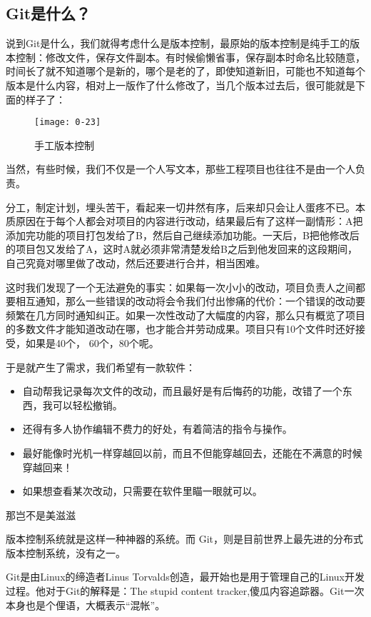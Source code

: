\subsection{Git是什么？}
说到Git是什么，我们就得考虑什么是版本控制，最原始的版本控制是纯手工的版本控制：修改文件，保存文件副本。有时候偷懒省事，保存副本时命名比较随意，时间长了就不知道哪个是新的，哪个是老的了，即使知道新旧，可能也不知道每个版本是什么内容，相对上一版作了什么修改了，当几个版本过去后，很可能就是下面的样子了：
\begin{figure}[htbp]
  \centering
  \texttt{[image: 0-23]}
  \caption{手工版本控制}\label{fig:0-23}
\end{figure}

当然，有些时候，我们不仅是一个人写文本，那些工程项目也往往不是由一个人负责。

分工，制定计划，埋头苦干，看起来一切井然有序，后来却只会让人蛋疼不已。本质原因在于每个人都会对项目的内容进行改动，结果最后有了这样一副情形：A把添加完功能的项目打包发给了B，然后自己继续添加功能。一天后，B把他修改后的项目包又发给了A，这时A就必须非常清楚发给B之后到他发回来的这段期间，自己究竟对哪里做了改动，然后还要进行合并，相当困难。

这时我们发现了一个无法避免的事实：如果每一次小小的改动，项目负责人之间都要相互通知，那么一些错误的改动将会令我们付出惨痛的代价：一个错误的改动要频繁在几方同时通知纠正。如果一次性改动了大幅度的内容，那么只有概览了项目的多数文件才能知道改动在哪，也才能合并劳动成果。项目只有10个文件时还好接受，如果是40个， 60个，80个呢。

于是就产生了需求，我们希望有一款软件：
\begin{itemize}
    \item 自动帮我记录每次文件的改动，而且最好是有后悔药的功能，改错了一个东西，我可以轻松撤销。
	\item 还得有多人协作编辑不费力的好处，有着简洁的指令与操作。
	\item 最好能像时光机一样穿越回以前，而且不但能穿越回去，还能在不满意的时候穿越回来！
	\item 如果想查看某次改动，只需要在软件里瞄一眼就可以。
\end{itemize}
那岂不是美滋滋~

版本控制系统就是这样一种神器的系统。而 Git，则是目前世界上最先进的分布式版本控制系统，没有之一。

Git是由Linux的缔造者Linus Torvalds创造，最开始也是用于管理自己的Linux开发过程。他对于Git的解释是：The stupid content tracker,傻瓜内容追踪器。Git一次本身也是个俚语，大概表示“混帐”。

